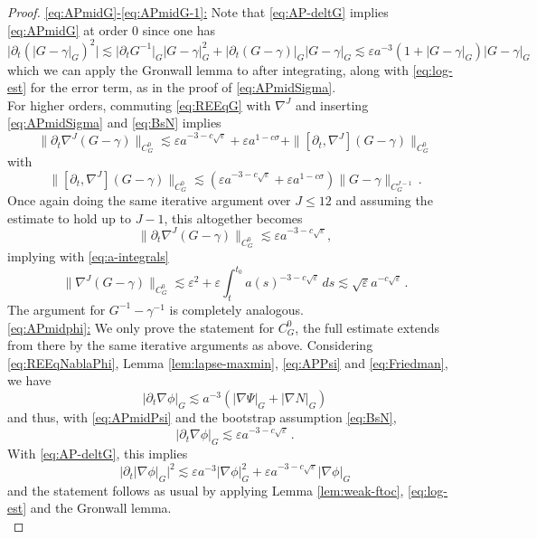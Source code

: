 \documentclass[11pt,leqno,textwidth=10cm]{amsart}
\numberwithin{equation}{section}
\theoremstyle{definition}
\theoremstyle{plain}
\newcommand{\1}{\mathbbm{1}}
\renewcommand{\epsilon}{\varepsilon}
\newcommand{\del}{\partial}
\begin{document}
\begin{proof}
\underline{\eqref{eq:APmidG}-\eqref{eq:APmidG-1}:} Note that \eqref{eq:AP-deltG} implies \eqref{eq:APmidG} at order $0$ since one has
\[\lvert\del_t(\lvert G-\gamma\rvert_G)^2\rvert\lesssim\lvert\del_tG^{-1}\rvert_G\lvert G-\gamma\rvert_G^2+\lvert\del_t(G-\gamma)\rvert_G\lvert G-\gamma\rvert_G\lesssim \epsilon a^{-3}(1+\lvert G-\gamma\rvert_G)\lvert G-\gamma\rvert_G\]
which we can apply the Gronwall lemma to after integrating, along with \eqref{eq:log-est} for the error term, as in the proof of \eqref{eq:APmidSigma}.\\
For higher orders, commuting \eqref{eq:REEqG} with $\nabla^J$ and inserting \eqref{eq:APmidSigma} and \eqref{eq:BsN} implies
\[\|\del_t\nabla^J(G-\gamma)\|_{C^0_G}\lesssim \epsilon a^{-3-c\sqrt{\epsilon}}+\epsilon a^{1-c\sigma}+\|[\del_t,\nabla^J](G-\gamma)\|_{C^0_G}\]
with
\[\|[\del_t,\nabla^J](G-\gamma)\|_{C^0_G}\lesssim \left(\epsilon a^{-3-c\sqrt{\epsilon}}+\epsilon a^{1-c\sigma}\right)\|G-\gamma\|_{C^{J-1}_G}\,.\]
Once again doing the same iterative argument over $J\leq 12$ and assuming the estimate to hold up to $J-1$, this altogether becomes
\[\|\del_t\nabla^J(G-\gamma)\|_{C^0_G}\lesssim \epsilon a^{-3-c\sqrt{\epsilon}},\]
implying with \eqref{eq:a-integrals}
\[\|\nabla^J(G-\gamma)\|_{C^0_G}\lesssim \epsilon^2+\epsilon\int_t^{t_0}a(s)^{-3-c\sqrt{\epsilon}}\,ds\lesssim\sqrt{\epsilon}a^{-c\sqrt{\epsilon}}\,.\]
The argument for $G^{-1}-\gamma^{-1}$ is completely analogous.\\

\underline{\eqref{eq:APmidphi}:} We only prove the statement for $C^0_G$, the full estimate extends from there by the same iterative arguments as above. Considering \eqref{eq:REEqNablaPhi}, Lemma \ref{lem:lapse-maxmin}, \eqref{eq:APPsi} and \eqref{eq:Friedman}, we have
\begin{equation*}
\lvert\del_t\nabla\phi\rvert_G\lesssim a^{-3}\left(\lvert\nabla\Psi\rvert_G+\lvert\nabla N\rvert_G\right)
\end{equation*}
and thus, with \eqref{eq:APmidPsi} and the bootstrap assumption \eqref{eq:BsN},
\begin{equation*}
\lvert\del_t\nabla\phi\rvert_G\lesssim \epsilon a^{-3-c\sqrt{\epsilon}}\,.
\end{equation*}
With \eqref{eq:AP-deltG}, this implies
\begin{equation*}
\lvert\del_t\lvert\nabla\phi\rvert_G\rvert^2\lesssim \epsilon a^{-3}\lvert\nabla\phi\rvert_G^2+\epsilon a^{-3-c\sqrt{\epsilon}}\lvert\nabla\phi\rvert_G
\end{equation*}
and the statement follows as usual by applying Lemma \ref{lem:weak-ftoc}, \eqref{eq:log-est} and the Gronwall lemma.\\


\end{proof}
\end{document}
